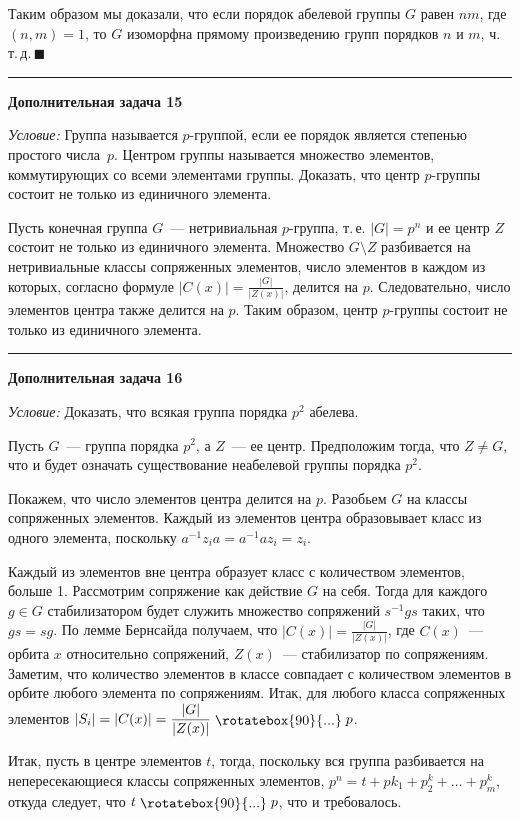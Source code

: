\documentclass[12pt,a4paper]{article}
\newcommand{\divis}{\mathrel{\raisebox{-1pt}{\rotatebox{90}{...}}}}
\newcommand{\sbs}{\large \bfseries}
\newcommand{\rl}{\vspace{16pt} \hrule \vspace{8pt}}
\begin{document}
Таким образом мы доказали, что если порядок абелевой группы $G$ равен $nm$, где $(n,m) = 1$, то $G$ изоморфна прямому произведению групп порядков $n$ и $m$, ч.\,т.\,д.\,$\blacksquare$




\rl
{\sbs Дополнительная задача 15}

{\itshape Условие: } Группа называется $p$-группой, если ее порядок является степенью простого числа~$p$. Центром группы называется множество элементов, коммутирующих со всеми элементами группы. Доказать, что центр  $p$-группы состоит не только из единичного элемента.

Пусть конечная группа $G$~--- нетривиальная $p$-группа, т.\,е.  $|G|=p^n$ и ее центр $Z$ состоит не только из единичного элемента. Множество $ G\setminus Z$ разбивается на нетривиальные классы сопряженных элементов, число элементов в каждом из которых, согласно формуле  $|C(x)|=\frac{|G|}{|Z(x)|}$, делится на  $p$. Следовательно, число элементов центра также делится на $p$. Таким образом, центр $p$-группы состоит не только из единичного элемента.




\rl
{\sbs Дополнительная задача 16}

{\itshape Условие: } Доказать, что всякая группа порядка $p^2$ абелева.

Пусть $G$~--- группа порядка $p^2$, а $Z$~--- ее центр. Предположим тогда, что $Z\neq G$, что и будет означать существование неабелевой группы порядка $p^2$.

Покажем, что число элементов центра делится на $p$. Разобьем $G$ на классы сопряженных элементов. Каждый из элементов центра образовывает класс из одного элемента, поскольку $a^{-1}z_ia = a^{-1}az_i = z_i$.

Каждый из элементов вне центра образует класс с количеством элементов, больше 1. Рассмотрим сопряжение как действие $G$ на себя. Тогда для каждого $g\in G$ стабилизатором будет служить множество сопряжений $s^{-1}gs$ таких, что $gs = sg$. По лемме Бернсайда получаем, что $\displaystyle |C(x)|=\frac{|G|}{|Z(x)|}$, где $C(x)$~--- орбита $x$ относительно сопряжений, $Z(x)$~--- стабилизатор по сопряжениям. Заметим, что количество элементов в классе совпадает с количеством элементов в орбите любого элемента по сопряжениям. Итак, для любого класса сопряженных элементов $\displaystyle |S_i|=|C(x)|=\frac{|G|}{|Z(x)|}\divis p$.

Итак, пусть в центре элементов $t$, тогда, поскольку вся группа разбивается на непересекающиеся классы сопряженных элементов, $p^n = t + pk_1 + p^k_2 +\ldots+ p^k_m$, откуда следует, что $t\divis p$, что и требовалось.
\end{document}

